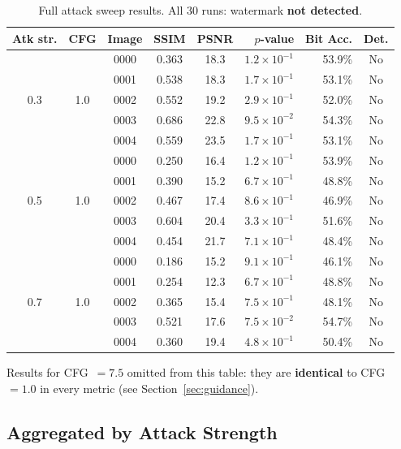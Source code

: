 \documentclass[11pt,a4paper]{article}
\begin{document}
\begin{table}[h]
\centering
\caption{Full attack sweep results. All 30 runs: watermark \textbf{not detected}.}
\label{tab:full}
\small
\begin{tabular}{cccccrrc}
\toprule
\textbf{Atk str.} & \textbf{CFG} & \textbf{Image} & \textbf{SSIM} & \textbf{PSNR} & \textbf{$p$-value} & \textbf{Bit Acc.} & \textbf{Det.} \\
\midrule
\multirow{5}{*}{0.3} & \multirow{5}{*}{1.0}
& 0000 & 0.363 & 18.3 & $1.2 \times 10^{-1}$ & 53.9\% & No \\
&& 0001 & 0.538 & 18.3 & $1.7 \times 10^{-1}$ & 53.1\% & No \\
&& 0002 & 0.552 & 19.2 & $2.9 \times 10^{-1}$ & 52.0\% & No \\
&& 0003 & 0.686 & 22.8 & $9.5 \times 10^{-2}$ & 54.3\% & No \\
&& 0004 & 0.559 & 23.5 & $1.7 \times 10^{-1}$ & 53.1\% & No \\
\midrule
\multirow{5}{*}{0.5} & \multirow{5}{*}{1.0}
& 0000 & 0.250 & 16.4 & $1.2 \times 10^{-1}$ & 53.9\% & No \\
&& 0001 & 0.390 & 15.2 & $6.7 \times 10^{-1}$ & 48.8\% & No \\
&& 0002 & 0.467 & 17.4 & $8.6 \times 10^{-1}$ & 46.9\% & No \\
&& 0003 & 0.604 & 20.4 & $3.3 \times 10^{-1}$ & 51.6\% & No \\
&& 0004 & 0.454 & 21.7 & $7.1 \times 10^{-1}$ & 48.4\% & No \\
\midrule
\multirow{5}{*}{0.7} & \multirow{5}{*}{1.0}
& 0000 & 0.186 & 15.2 & $9.1 \times 10^{-1}$ & 46.1\% & No \\
&& 0001 & 0.254 & 12.3 & $6.7 \times 10^{-1}$ & 48.8\% & No \\
&& 0002 & 0.365 & 15.4 & $7.5 \times 10^{-1}$ & 48.1\% & No \\
&& 0003 & 0.521 & 17.6 & $7.5 \times 10^{-2}$ & 54.7\% & No \\
&& 0004 & 0.360 & 19.4 & $4.8 \times 10^{-1}$ & 50.4\% & No \\
\bottomrule
\end{tabular}
\vspace{0.5em}

{\footnotesize Results for CFG~$= 7.5$ omitted from this table: they are
\textbf{identical} to CFG~$= 1.0$ in every metric (see Section~\ref{sec:guidance}).}
\end{table}

\subsection{Aggregated by Attack Strength}
\end{document}

